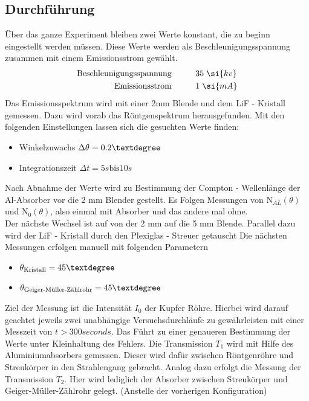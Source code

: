 \subsection{Durchführung}
Über das ganze Experiment bleiben zwei Werte konstant, die zu beginn eingestellt werden müssen.
Diese Werte werden als Beschleunigungsspannung zusammen mit einem Emissionsstrom gewählt. 
\begin{align*}
\text{Beschleunigungsspannung} &  \hspace{1 cm} 35 \hspace{0.1 cm}\si{kv} \\
\text{Emissionsstrom} &  \hspace{1 cm}   1 \hspace{0.1 cm} \si{mA}\\
\end{align*}
Das Emissionsspektrum wird mit einer 2mm Blende und dem LiF - Kristall gemessen. 
Dazu wird vorab das Röntgenspektrum herausgefunden. Mit den folgenden Einstellungen lassen sich die gesuchten Werte finden:
\begin{itemize}
\item{Winkelzuwachs $\Delta \theta = 0.2 \textdegree$}
\item{Integrationszeit $\Delta t = 5 \si{s} \text{bis} 10 \si{s}$}
\end{itemize}
Nach Abnahme der Werte wird zu Bestimmung der Compton - Wellenlänge der Al-Absorber vor die 2 mm Blender gestellt.
Es Folgen Messungen von $\text{N}_{AL}(\theta)$ und $\text{N}_{0}(\theta)$, also einmal mit Absorber und das andere mal ohne.
\\
\newline
Der nächste Wechsel ist auf von der 2 mm  auf die 5 mm Blende. Parallel dazu wird der LiF - Kristall durch den Plexiglas - Streuer getauscht
Die nächsten Messungen erfolgen manuell mit folgenden Parametern
\begin{itemize}
\item{$\theta_{\text{Kristall}}  = 45 \textdegree$}
\item{$\theta_{\text{Geiger-Müller-Zählrohr}}  = 45 \textdegree$}
\end{itemize}
Ziel der Messung ist die Intensität $I_0$ der Kupfer Röhre.
Hierbei wird darauf geachtet jeweils zwei unabhängige Versuchsdurchläufe zu gewährleisten mit einer Messzeit von $t > \si{300}{seconds}$.
Das Führt zu einer genaueren Bestimmung der Werte unter Kleinhaltung des Fehlers.
Die Transmission $T_1$ wird mit Hilfe des Aluminiumabsorbers gemessen. Dieser wird dafür zwischen Röntgenröhre und Streukörper in den Strahlengang
gebracht. Analog dazu erfolgt die Messung der Transmission $T_2$. Hier wird lediglich der Absorber zwischen Streukörper und Geiger-Müller-Zählrohr gelegt. (Anstelle der vorherigen Konfiguration)